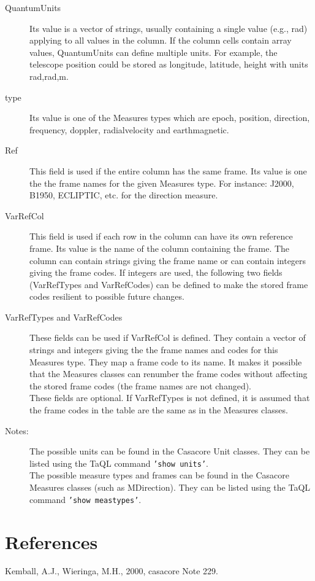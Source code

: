 \documentclass{article}
\begin{document}
\begin{description}

\item[QuantumUnits] Its value is a vector of strings, usually
containing a single value (e.g., rad) applying to all values in the
column. If the column cells contain array values,
QuantumUnits can define multiple units. For example, the telescope
position could be stored as longitude, latitude, height with units rad,rad,m.

\item[type] Its value is one of the Measures types which are
epoch, position, direction, frequency, doppler, radialvelocity and
earthmagnetic.

\item[Ref] This field is used if the entire column has the same frame.
Its value is one the the frame names for the given Measures
type. For instance: J2000, B1950, ECLIPTIC, etc. for the direction
measure.

\item[VarRefCol] This field is used if each row in the column can have
its own reference frame. Its value is the name of the column
containing the frame. The column can contain strings giving the frame
name or can contain integers giving the frame codes. If integers are
used, the following two fields (VarRefTypes and VarRefCodes) can be
defined to make the stored frame codes resilient to possible future
changes. 

\item[VarRefTypes and VarRefCodes] These fields can be used if
VarRefCol is defined. They contain a vector of
strings and integers  giving the the frame names and codes for this Measures type.
They map a frame code to its name.  It makes it possible that the
Measures classes can renumber the frame codes without affecting the
stored frame codes (the frame names are not changed).
\\These fields are optional. If VarRefTypes is not defined, it is assumed that the frame
codes in the table are the same as in the Measures classes.

\item[Notes:]
The possible units can be found in the Casacore Unit classes. They
can be listed using the TaQL command {\tt 'show units'}.
\\The possible measure types and frames can be found in the Casacore
Measures classes (such as MDirection). They
can be listed using the TaQL command {\tt 'show meastypes'}.

\end{description}

\section{References}

\noindent Kemball, A.J., Wieringa, M.H., 2000, casacore Note 229.
\end{document}
